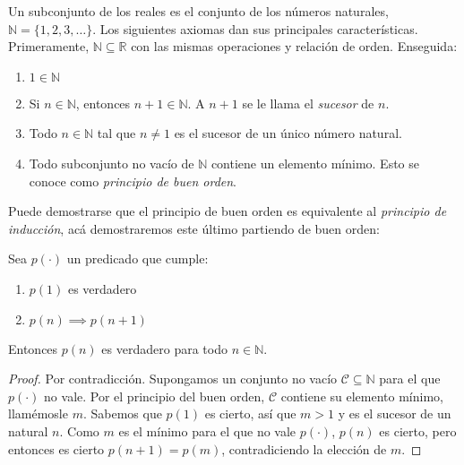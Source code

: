   Un subconjunto de los reales
  es el conjunto de los números naturales,%
  \(\mathbb{N} = \{1, 2, 3, \dotsc\}\).
  Los siguientes axiomas dan sus principales características.%
  Primeramente,
  \(\mathbb{N} \subseteq \mathbb{R}\) con las mismas operaciones
  y relación de orden.
  Enseguida:
  \begin{enumerate}[label=\textbf{N\arabic{*}:}, ref=N\arabic{*}]
  \item\label{N:uno}
    \(1 \in \mathbb{N}\)
  \item\label{N:sucesor}
    Si \(n \in \mathbb{N}\),
    entonces \(n + 1 \in \mathbb{N}\).
    A \(n + 1\) se le llama el \emph{sucesor} de \(n\).
  \item\label{N:solo-sucesores}
    Todo \(n \in \mathbb{N}\) tal que \(n \ne 1\)
    es el sucesor de un único número natural.
  \item\label{N:buen-orden}
    Todo subconjunto no vacío de \(\mathbb{N}\) contiene un elemento mínimo.
    Esto se conoce como \emph{principio de buen orden}.%
  \end{enumerate}
  Puede demostrarse que el principio de buen orden
  es equivalente al \emph{principio de inducción},
  acá demostraremos este último partiendo de buen orden:
  \begin{theorem}
    \label{theo:principio-induccion}
    Sea \(p(\cdot)\) un predicado que cumple:
    \begin{enumerate}[label=(\roman{*})]
    \item
      \(p(1)\) es verdadero
    \item
      \(p(n) \implies p(n + 1)\)
    \end{enumerate}
    Entonces \(p(n)\) es verdadero para todo \(n \in \mathbb{N}\).
  \end{theorem}
  \begin{proof}
    Por contradicción.
    Supongamos un conjunto no vacío
    \(\mathcal{C} \subseteq \mathbb{N}\) para el que \(p(\cdot)\) no vale.
    Por el principio del buen orden,
    \(\mathcal{C}\) contiene su elemento mínimo,
    llamémosle \(m\).
    Sabemos que \(p(1)\) es cierto,
    así que \(m > 1\) y es el sucesor de un natural \(n\).
    Como \(m\) es el mínimo para el que no vale \(p(\cdot)\),
    \(p(n)\) es cierto,
    pero entonces es cierto \(p(n + 1) = p(m)\),
    contradiciendo la elección de \(m\).
  \end{proof}

